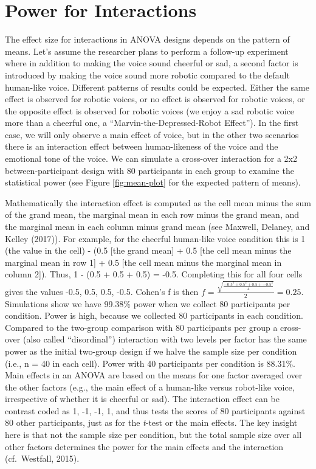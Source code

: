 \documentclass[
  ,jou,floatsintext]{apa6}
\begin{document}
\hypertarget{power-for-interactions}{%
\section{Power for Interactions}\label{power-for-interactions}}

The effect size for interactions in ANOVA designs depends on the pattern of means.
Let's assume the researcher plans to perform a follow-up experiment where in addition to making the voice sound cheerful or sad, a second factor is introduced by making the voice sound more robotic compared to the default human-like voice.
Different patterns of results could be expected.
Either the same effect is observed for robotic voices, or no effect is observed for robotic voices, or the opposite effect is observed for robotic voices (we enjoy a sad robotic voice more than a cheerful one, a \enquote{Marvin-the-Depressed-Robot Effect}).
In the first case, we will only observe a main effect of voice, but in the other two scenarios there is an interaction effect between human-likeness of the voice and the emotional tone of the voice.
We can simulate a cross-over interaction for a 2x2 between-participant design with 80 participants in each group to examine the statistical power (see Figure \ref{fig:mean-plot} for the expected pattern of means).

Mathematically the interaction effect is computed as the cell mean minus the sum of the grand mean, the marginal mean in each row minus the grand mean, and the marginal mean in each column minus grand mean (see Maxwell, Delaney, and Kelley (2017)). For example, for the cheerful human-like voice condition this is 1 (the value in the cell) - (0.5 {[}the grand mean{]} + 0.5 {[}the cell mean minus the marginal mean in row 1{]} + 0.5 {[}the cell mean minus the marginal mean in column 2{]}).
Thus, 1 - (0.5 + 0.5 + 0.5) = -0.5.
Completing this for all four cells gives the values -0.5, 0.5, 0.5, -0.5.
Cohen's f is then \(f = \frac { \sqrt { \frac { -0.5^2 + 0.5^2 + 0.5 + -0.5^2 } { 4 } }}{ 2 } = 0.25\).
Simulations show we have 99.38\% power when we collect 80 participants per condition.
Power is high, because we collected 80 participants in each condition.
Compared to the two-group comparison with 80 participants per group a cross-over (also called \enquote{disordinal}) interaction with two levels per factor has the same power as the initial two-group design if we halve the sample size per condition (i.e., n = 40 in each cell).
Power with 40 participants per condition is 88.31\%.
Main effects in an ANOVA are based on the means for one factor averaged over the other factors (e.g., the main effect of a human-like versus robot-like voice, irrespective of whether it is cheerful or sad).
The interaction effect can be contrast coded as 1, -1, -1, 1, and thus tests the scores of 80 participants against 80 other participants, just as for the \emph{t}-test or the main effects.
The key insight here is that not the sample size per condition, but the total sample size over all other factors determines the power for the main effects and the interaction (cf.~Westfall, 2015).
\end{document}
